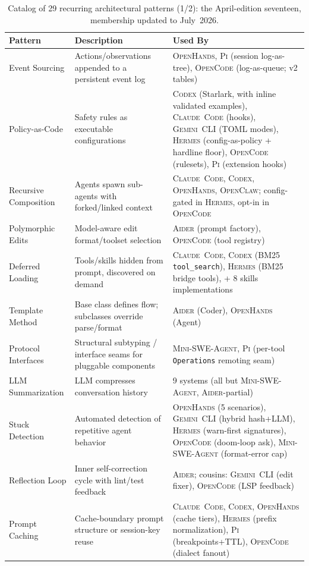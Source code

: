 \documentclass[11pt,a4paper]{article}
\newcommand{\clcode}{\textsc{Claude~Code}\xspace}
\newcommand{\cdx}{\textsc{Codex}\xspace}
\newcommand{\oh}{\textsc{OpenHands}\xspace}
\newcommand{\adr}{\textsc{Aider}\xspace}
\newcommand{\mswe}{\textsc{Mini-SWE-Agent}\xspace}
\newcommand{\ocl}{\textsc{OpenClaw}\xspace}
\newcommand{\gemini}{\textsc{Gemini~CLI}\xspace}
\newcommand{\hrm}{\textsc{Hermes}\xspace}
\newcommand{\pib}{\textsc{Pi}\xspace}
\newcommand{\ocd}{\textsc{OpenCode}\xspace}
\begin{document}
\begin{table}[H]
\centering
\caption{Catalog of 29 recurring architectural patterns (1/2): the April-edition seventeen, membership updated to July~2026.}
\label{tab:patterns}
\scriptsize
\renewcommand{\arraystretch}{1.2}
\begin{tabularx}{\textwidth}{@{}L{3cm} L{4.6cm} L{4.9cm}@{}}
\toprule
\textbf{Pattern} & \textbf{Description} & \textbf{Used By} \\
\midrule
Event Sourcing            & Actions/observations appended to a persistent event log & \oh{}, \pib{} (session log-as-tree), \ocd{} (log-as-queue; v2 tables) \\
Policy-as-Code            & Safety rules as executable configurations & \cdx{} (Starlark, with inline validated examples), \clcode{} (hooks), \gemini{} (TOML modes), \hrm{} (config-as-policy + hardline floor), \ocd{} (rulesets), \pib{} (extension hooks) \\
Recursive Composition     & Agents spawn sub-agents with forked/linked context & \clcode{}, \cdx{}, \oh{}, \ocl{}; config-gated in \hrm{}, opt-in in \ocd{} \\
Polymorphic Edits         & Model-aware edit format/toolset selection & \adr{} (prompt factory), \ocd{} (tool registry) \\
Deferred Loading          & Tools/skills hidden from prompt, discovered on demand & \clcode{}, \cdx{} (BM25 \texttt{tool\_search}), \hrm{} (BM25 bridge tools), + 8 skills implementations \\
Template Method           & Base class defines flow; subclasses override parse/format & \adr{} (Coder), \oh{} (Agent) \\
Protocol Interfaces       & Structural subtyping / interface seams for pluggable components & \mswe{}, \pib{} (per-tool \texttt{Operations} remoting seam) \\
LLM Summarization         & LLM compresses conversation history & 9 systems (all but \mswe{}, \adr{}-partial) \\
Stuck Detection           & Automated detection of repetitive agent behavior & \oh{} (5 scenarios), \gemini{} (hybrid hash+LLM), \hrm{} (warn-first signatures), \ocd{} (doom-loop ask), \mswe{} (format-error cap) \\
Reflection Loop           & Inner self-correction cycle with lint/test feedback & \adr{}; cousins: \gemini{} (edit fixer), \ocd{} (LSP feedback) \\
Prompt Caching            & Cache-boundary prompt structure or session-key reuse & \clcode{}, \cdx{}, \oh{} (cache tiers), \hrm{} (prefix normalization), \pib{} (breakpoints+TTL), \ocd{} (dialect fanout) \\

\end{tabularx}
\end{table}
\end{document}
